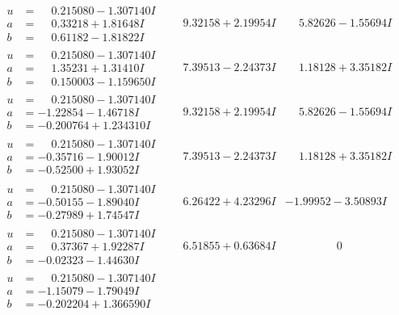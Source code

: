 \documentclass[1p]{elsarticle_modified}
\theoremstyle{definition}
\begin{document}
$$\begin{array}{c|c|c}
\begin{aligned}
u &= \phantom{-}0.215080 - 1.307140 I \\
a &= \phantom{-}0.33218 + 1.81648 I \\
b &= \phantom{-}0.61182 - 1.81822 I\end{aligned}
 & \phantom{-}9.32158 + 2.19954 I & \phantom{-}5.82626 - 1.55694 I \\ \hline\begin{aligned}
u &= \phantom{-}0.215080 - 1.307140 I \\
a &= \phantom{-}1.35231 + 1.31410 I \\
b &= \phantom{-}0.150003 - 1.159650 I\end{aligned}
 & \phantom{-}7.39513 - 2.24373 I & \phantom{-}1.18128 + 3.35182 I \\ \hline\begin{aligned}
u &= \phantom{-}0.215080 - 1.307140 I \\
a &= -1.22854 - 1.46718 I \\
b &= -0.200764 + 1.234310 I\end{aligned}
 & \phantom{-}9.32158 + 2.19954 I & \phantom{-}5.82626 - 1.55694 I \\ \hline\begin{aligned}
u &= \phantom{-}0.215080 - 1.307140 I \\
a &= -0.35716 - 1.90012 I \\
b &= -0.52500 + 1.93052 I\end{aligned}
 & \phantom{-}7.39513 - 2.24373 I & \phantom{-}1.18128 + 3.35182 I \\ \hline\begin{aligned}
u &= \phantom{-}0.215080 - 1.307140 I \\
a &= -0.50155 - 1.89040 I \\
b &= -0.27989 + 1.74547 I\end{aligned}
 & \phantom{-}6.26422 + 4.23296 I & -1.99952 - 3.50893 I \\ \hline\begin{aligned}
u &= \phantom{-}0.215080 - 1.307140 I \\
a &= \phantom{-}0.37367 + 1.92287 I \\
b &= -0.02323 - 1.44630 I\end{aligned}
 & \phantom{-}6.51855 + 0.63684 I & \phantom{-0.000000 } 0 \\ \hline\begin{aligned}
u &= \phantom{-}0.215080 - 1.307140 I \\
a &= -1.15079 - 1.79049 I \\
b &= -0.202204 + 1.366590 I\end{aligned}

\end{array}$$
\end{document}
